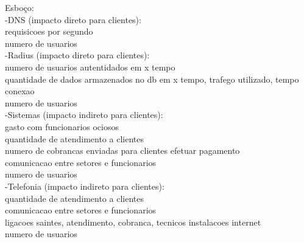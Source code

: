 Esboço:\\
-DNS (impacto direto para clientes): \\
requisicoes por segundo\\
numero de usuarios\\
-Radius (impacto direto para clientes): \\
numero de usuarios autentidados em x tempo\\
quantidade de dados armazenados no db em x tempo, trafego utilizado, tempo conexao\\
numero de usuarios\\
-Sistemas (impacto indireto para clientes): \\
gasto com funcionarios ociosos\\
quantidade de atendimento a clientes\\
numero de cobrancas enviadas para clientes efetuar pagamento\\
comunicacao entre setores e funcionarios\\
numero de usuarios\\
-Telefonia (impacto indireto para clientes): \\
quantidade de atendimento a clientes\\
comunicacao entre setores e funcionarios\\
ligacoes saintes, atendimento, cobranca, tecnicos instalacoes internet\\
numero de usuarios\\

